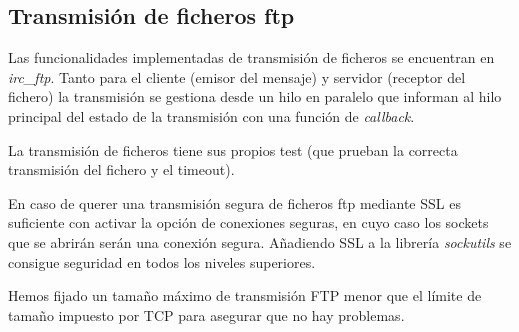 \subsection{Transmisión de ficheros ftp}

Las funcionalidades implementadas de transmisión de ficheros se encuentran en \textit{irc\_ftp}. Tanto para el cliente (emisor del mensaje) y servidor (receptor del fichero) la transmisión se gestiona desde un hilo en paralelo que informan al hilo principal del estado de la transmisión con una función de \textit{callback}. 


La transmisión de ficheros tiene sus propios test (que prueban la correcta transmisión del fichero y el timeout).


En caso de querer una transmisión segura de ficheros ftp mediante SSL es suficiente con activar la opción de conexiones seguras, en cuyo caso los sockets que se abrirán serán una conexión segura. Añadiendo SSL a la librería \textit{sockutils} se consigue seguridad en todos los niveles superiores.


Hemos fijado un tamaño máximo de transmisión FTP menor que el límite de tamaño impuesto por TCP para asegurar que no hay problemas.
